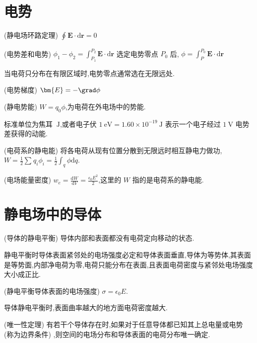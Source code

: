     \section{电势}
    \begin{theorem}
        (静电场环路定理) $\oint_{}^{}\bm{E}\cdot \mathrm{d}\bm{r}=0$
    \end{theorem}
    \begin{definition}
        (电势差和电势) $\phi_1-\phi_2=\int_{P_1}^{P_2}\bm{E}\cdot \mathrm{d}\bm{r}$ 选定电势零点 $P_0$ 后, $\phi=\int_{P}^{P_0}\bm{E}\cdot\mathrm{d}\bm{r}$
    \end{definition}
    当电荷只分布在有限区域时,电势零点通常选在无限远处.
    \begin{theorem}
        (电势梯度) $\bm{E}=-\grad \phi$
    \end{theorem}
    \begin{definition}
        (静电势能) $W=q_0\phi$,为电荷在外电场中的势能.
    \end{definition}
    标准单位为焦耳 $ \ \mathrm{J}$,或者电子伏 $1\ \mathrm{eV}=1.60\times 10^{-19} \ \mathrm{J}$ 表示一个电子经过 $1 \ \mathrm{V}$ 电势差获得的动能.
    \begin{definition}
        (电荷系的静电能) 将各电荷从现有位置分散到无限远时相互静电力做功, $W=\frac{1}{2}\sum_{}^{}q_{i}\phi_{i}=\frac{1}{2}\int_{q}^{}\phi\mathrm{d}q$.
    \end{definition}
    \begin{definition}
        (电场能量密度) $w_{e}=\frac{\mathrm{d}W}{\mathrm{d}V}=\frac{\epsilon_0E^2}{2}$,这里的 $W$ 指的是电荷系的静电能.
    \end{definition}
    \section{静电场中的导体}
    \begin{definition}
        (导体的静电平衡) 导体内部和表面都没有电荷定向移动的状态.
    \end{definition}
    静电平衡时导体表面紧邻处的电场强度必定和导体表面垂直,导体为等势体,其表面是等势面,内部净电荷为零,电荷只能分布在表面,且表面电荷密度与紧邻处电场强度大小成正比.
    \begin{theorem}
        (静电平衡导体表面的电场强度) $\sigma=\epsilon_0E$.
    \end{theorem}
    导体静电平衡时,表面曲率越大的地方面电荷密度越大.
    \begin{theorem}
        (唯一性定理) 有若干个导体存在时,如果对于任意导体都已知其上总电量或电势 (称为边界条件) ,则空间的电场分布和导体表面的电荷分布唯一确定.
    \end{theorem}
